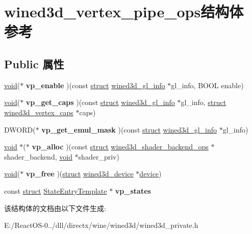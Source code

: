 \hypertarget{structwined3d__vertex__pipe__ops}{}\section{wined3d\+\_\+vertex\+\_\+pipe\+\_\+ops结构体 参考}
\label{structwined3d__vertex__pipe__ops}
\subsection*{Public 属性}
\begin{DoxyCompactItemize}
\item 
\mbox{\label{structwined3d__vertex__pipe__ops_a9b5fd1659b7aba8d80b488acb0ccd9da}} 
\hyperlink{interfacevoid}{void}($\ast$ {\bfseries vp\+\_\+enable} )(const \hyperlink{interfacestruct}{struct} \hyperlink{structwined3d__gl__info}{wined3d\+\_\+gl\+\_\+info} $\ast$gl\+\_\+info, B\+O\+OL enable)
\item 
\mbox{\label{structwined3d__vertex__pipe__ops_a6746663c288f0b0047f01ab2303ccaa9}} 
\hyperlink{interfacevoid}{void}($\ast$ {\bfseries vp\+\_\+get\+\_\+caps} )(const \hyperlink{interfacestruct}{struct} \hyperlink{structwined3d__gl__info}{wined3d\+\_\+gl\+\_\+info} $\ast$gl\+\_\+info, \hyperlink{interfacestruct}{struct} \hyperlink{structwined3d__vertex__caps}{wined3d\+\_\+vertex\+\_\+caps} $\ast$caps)
\item 
\mbox{\label{structwined3d__vertex__pipe__ops_a396b93aa8629bf9a261cde6c72b14df2}} 
D\+W\+O\+RD($\ast$ {\bfseries vp\+\_\+get\+\_\+emul\+\_\+mask} )(const \hyperlink{interfacestruct}{struct} \hyperlink{structwined3d__gl__info}{wined3d\+\_\+gl\+\_\+info} $\ast$gl\+\_\+info)
\item 
\mbox{\label{structwined3d__vertex__pipe__ops_af9d1bc1bf711ede86fcedcbd3ccd5d7d}} 
\hyperlink{interfacevoid}{void} $\ast$($\ast$ {\bfseries vp\+\_\+alloc} )(const \hyperlink{interfacestruct}{struct} \hyperlink{structwined3d__shader__backend__ops}{wined3d\+\_\+shader\+\_\+backend\+\_\+ops} $\ast$shader\+\_\+backend, \hyperlink{interfacevoid}{void} $\ast$shader\+\_\+priv)
\item 
\mbox{\label{structwined3d__vertex__pipe__ops_a9be25ccc6fe326219713b164c5e5f163}} 
\hyperlink{interfacevoid}{void}($\ast$ {\bfseries vp\+\_\+free} )(\hyperlink{interfacestruct}{struct} \hyperlink{structwined3d__device}{wined3d\+\_\+device} $\ast$\hyperlink{structdevice}{device})
\item 
\mbox{\label{structwined3d__vertex__pipe__ops_ab9ae7826f25a95e2bac7891dfe4c4298}} 
const \hyperlink{interfacestruct}{struct} \hyperlink{struct_state_entry_template}{State\+Entry\+Template} $\ast$ {\bfseries vp\+\_\+states}
\end{DoxyCompactItemize}


该结构体的文档由以下文件生成\+:\begin{DoxyCompactItemize}
\item 
E\+:/\+React\+O\+S-\/0../dll/directx/wine/wined3d/wined3d\+\_\+private.\+h\end{DoxyCompactItemize}
